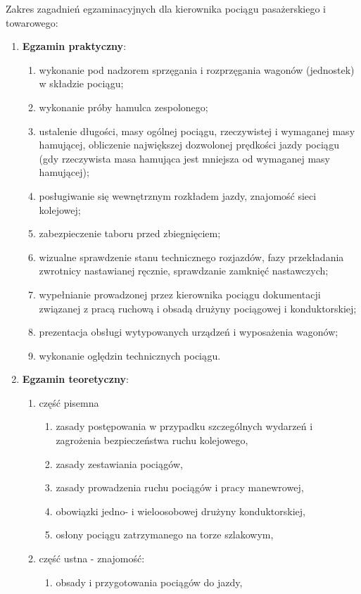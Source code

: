 Zakres zagadnień egzaminacyjnych dla kierownika pociągu pasażerskiego i towarowego:
\begin{enumerate}
	\item \textbf{Egzamin praktyczny}:
	\begin{enumerate}
		\item wykonanie pod nadzorem sprzęgania i rozprzęgania wagonów (jednostek) w składzie
		pociągu;
		\item wykonanie próby hamulca zespolonego;
		\item ustalenie długości, masy ogólnej pociągu, rzeczywistej i wymaganej masy hamującej, obliczenie największej dozwolonej prędkości jazdy pociągu (gdy rzeczywista masa hamująca jest mniejsza od wymaganej masy hamującej);
		\item posługiwanie się wewnętrznym rozkładem jazdy, znajomość sieci kolejowej;
		\item zabezpieczenie taboru przed zbiegnięciem;
		\item wizualne sprawdzenie stanu technicznego rozjazdów, fazy przekładania zwrotnicy nastawianej ręcznie, sprawdzanie zamknięć nastawczych;
		\item wypełnianie prowadzonej przez kierownika pociągu dokumentacji związanej z pracą ruchową i obsadą drużyny pociągowej i konduktorskiej;
		\item prezentacja obsługi wytypowanych urządzeń i wyposażenia wagonów;
		\item wykonanie oględzin technicznych pociągu.
	\end{enumerate}
	\item \textbf{Egzamin teoretyczny}:
	\begin{enumerate}
		\item część pisemna
		\begin{enumerate}
			\item zasady postępowania w przypadku szczególnych wydarzeń i zagrożenia bezpieczeństwa ruchu kolejowego,
			\item zasady zestawiania pociągów,
			\item zasady prowadzenia ruchu pociągów i pracy manewrowej,
			\item obowiązki jedno- i wieloosobowej drużyny konduktorskiej,
			\item osłony pociągu zatrzymanego na torze szlakowym,
		\end{enumerate}
		\item część ustna - znajomość:
		\begin{enumerate}
			\item obsady i przygotowania pociągów do jazdy,

\end{enumerate}
\end{enumerate}
\end{enumerate}

